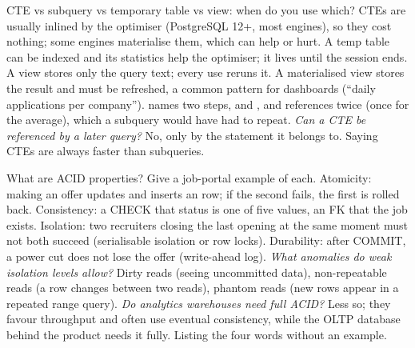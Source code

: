 \begin{qa}{CTE vs subquery vs temporary table vs view: when do you use which?}
\why CTEs are usually inlined by the optimiser (PostgreSQL 12+, most engines), so they cost nothing; some engines materialise them, which can help or hurt.
A temp table can be indexed and its statistics help the optimiser; it lives until the session ends. A view stores only the query text; every use reruns it.
A materialised view stores the result and must be refreshed, a common pattern for dashboards (``daily applications per company'').
\worked {} names two steps,  and , and references  twice (once for the average), which a
subquery would have had to repeat.
\pushes \emph{Can a CTE be referenced by a later query?} No, only by the statement it belongs to.
\pitfall Saying CTEs are always faster than subqueries.
\end{qa}

\begin{qa}{What are ACID properties? Give a job-portal example of each.}
\why Atomicity: making an offer updates  and inserts an  row; if the second fails, the first is rolled back.
Consistency: a CHECK that status is one of five values, an FK that the job exists. Isolation: two recruiters closing the last opening at the same moment
must not both succeed (serialisable isolation or row locks). Durability: after COMMIT, a power cut does not lose the offer (write-ahead log).
\pushes \emph{What anomalies do weak isolation levels allow?} Dirty reads (seeing uncommitted data), non-repeatable reads (a row changes between two reads),
phantom reads (new rows appear in a repeated range query). \emph{Do analytics warehouses need full ACID?} Less so; they favour throughput and often use
eventual consistency, while the OLTP database behind the product needs it fully.
\pitfall Listing the four words without an example.
\end{qa}

